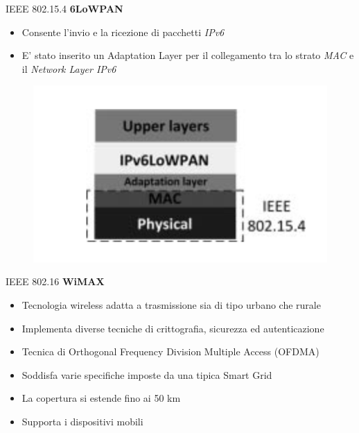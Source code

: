 \begin{frame}{IEEE 802.15.4}
	\textbf{6LoWPAN}
	\begin{itemize}
		\item Consente l'invio e la ricezione di pacchetti \textit{IPv6}
		\item E' stato inserito un Adaptation Layer per il collegamento tra lo strato \textit{MAC} e il \textit{Network Layer IPv6}
	\end{itemize}
	\begin{figure}[h]
		\includegraphics[scale=0.3,cfbox=blue_slides 1pt 0pt]{imgs/6pan.png}
	\end{figure}
\end{frame}

\begin{frame}{IEEE 802.16}
	\textbf{WiMAX}
	\begin{itemize}[<+- | alert@+>]
		\item Tecnologia wireless adatta a trasmissione sia di tipo urbano che rurale
		\item Implementa diverse tecniche di crittografia, sicurezza ed autenticazione
		\item Tecnica di Orthogonal Frequency Division Multiple Access (OFDMA)
		\item Soddisfa varie specifiche imposte da una tipica Smart Grid
		\item La copertura si estende fino ai 50 km
		\item Supporta i dispositivi mobili
	\end{itemize}
\end{frame}

